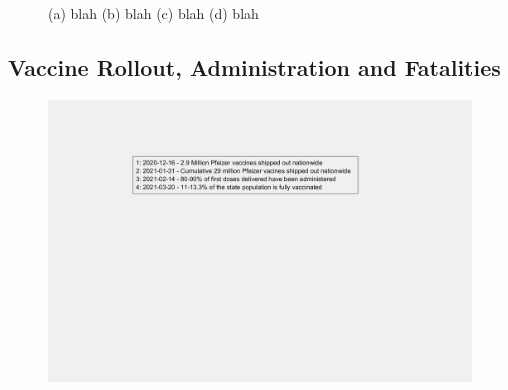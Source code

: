 \documentclass[]{article}
\begin{document}
\begin{figure}
	\caption{(a) blah (b) blah (c) blah (d) blah}
	\label{fig:foobar}
\end{figure}
\FloatBarrier
\vspace{5mm}

\subsection{Vaccine Rollout, Administration and Fatalities}

\begin{figure}[!h]
	\includegraphics[width=\linewidth]{legends/vaccine_rollout_legend.png}
	\caption{}
	\label{fig:legends/vaccine_rollout_legendLabel}
\end{figure}
\end{document}
